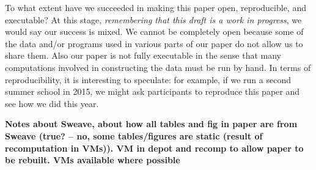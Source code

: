 To what extent have we succeeded in making this paper open, reproducible, and executable?  At this stage,
\emph{remembering that this draft is a work in progress}, we would say our success is mixed.  We cannot be completely open because
some of the data and/or programs used in various parts of our paper do not allow us to share them.  Also our paper is not fully executable in the sense that many 
computations involved in constructing the data must be run by hand.   In terms of reproducibility, it is interesting to speculate: for example, if we run a second summer school in 2015, we might ask participants to reproduce this paper and see how we did this year.



\textbf{Notes about Sweave, about how all tables and fig in paper are from
Sweave (true? -- no, some tables/figures are static (result of recomputation in
VMs)).  
VM in depot and recomp to allow paper to be rebuilt.
VMs available where possible}


